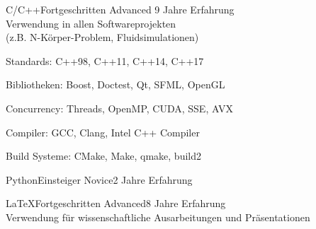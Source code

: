 \documentclass[a4paper,10pt]{cv}
\begin{document}
      \begin{multicols}{2}
        \begin{cvSkillItem}{C/C++}{Fortgeschritten}
          Advanced \hfill 9 Jahre Erfahrung \\[1pt]
          Verwendung in allen Softwareprojekten \\
          (z.B. N-Körper-Problem, Fluidsimulationen)
          \begin{cvItemize}
            \item Standards: C++98, C++11, C++14, C++17
            \item Bibliotheken: Boost, Doctest, Qt, SFML, OpenGL
            \item Concurrency: Threads, OpenMP, CUDA, SSE, AVX
            \item Compiler: GCC, Clang, Intel C++ Compiler
            \item Build Systeme: CMake, Make, qmake, build2
          \end{cvItemize}
        \end{cvSkillItem}
        \begin{cvSkillItem}{Python}{Einsteiger}
          Novice\hfill 2 Jahre Erfahrung
        \end{cvSkillItem}
        \begin{cvSkillItem}{LaTeX}{Fortgeschritten}
          Advanced\hfill 8 Jahre Erfahrung\\[1pt]
          Verwendung für wissenschaftliche Ausarbeitungen und Präsentationen
        \end{cvSkillItem}
      \end{multicols}
\end{document}
